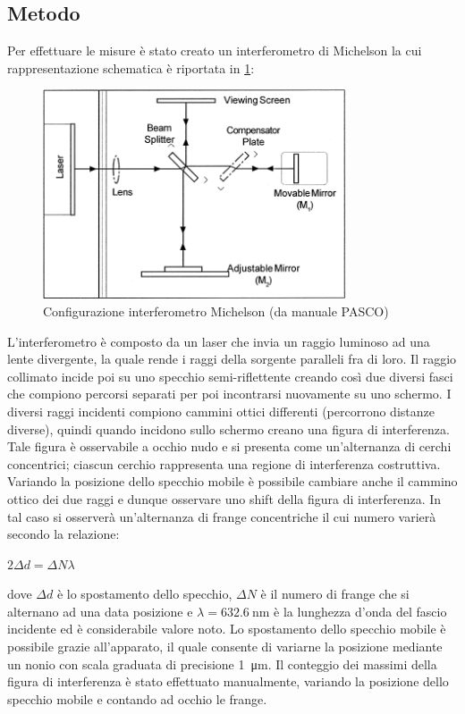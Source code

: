 \documentclass[a4paper]{article}
\begin{document}
\subsection{Metodo}
Per effettuare le misure è stato creato un interferometro di Michelson la cui rappresentazione schematica è riportata in \cref{fig:configurazione-michelson}:
\begin{figure}[htbp]
\centering
\includegraphics[width=0.8\textwidth]{./grafici/configurazione michaelson.png}
\caption{Configurazione interferometro Michelson (da manuale PASCO)}
\label{fig:configurazione-michelson}
\end{figure}
L'interferometro è composto da un laser che invia un raggio luminoso ad una lente divergente, la quale rende i raggi della sorgente paralleli fra di loro. Il raggio collimato incide poi su uno specchio semi-riflettente creando così due diversi fasci che compiono percorsi separati per poi incontrarsi nuovamente su uno schermo. I diversi raggi incidenti compiono cammini ottici differenti (percorrono distanze diverse), quindi quando incidono sullo schermo creano una figura di interferenza. Tale figura è osservabile a occhio nudo e si presenta come un'alternanza di cerchi concentrici; ciascun cerchio rappresenta una regione di interferenza costruttiva. Variando la posizione dello specchio mobile è possibile cambiare anche il cammino ottico dei due raggi e dunque osservare uno shift della figura di interferenza. In tal caso si osserverà un'alternanza di frange concentriche il cui numero varierà secondo la relazione: 
\begin{center}
    $2 \Delta d=\Delta N \lambda $
\end{center}
dove $\Delta d$ è lo spostamento dello specchio, $\Delta N$ è il numero di frange che si alternano ad una data posizione e $\lambda=\SI{632.6}{\nano\meter}$ è la lunghezza d'onda del fascio incidente ed è considerabile valore noto. Lo spostamento dello specchio mobile è possibile grazie all'apparato, il quale consente di variarne la posizione mediante un nonio con scala graduata di precisione \SI{1}{\micro\meter}. Il conteggio dei massimi della figura di interferenza è stato effettuato manualmente, variando la posizione dello specchio mobile e contando ad occhio le frange.
\end{document}
